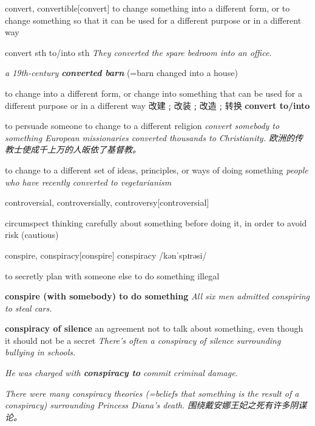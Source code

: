 \begin{DefWord}{convert, convertible}[convert]
    to change something into a different form, or to change something so that it can be used for a different purpose or in a different way

    convert sth to/into sth
    \textit{They converted the spare bedroom into an office.}

    \textit{a 19th-century \textbf{converted barn}} (=barn changed into a house)

    to change into a different form, or change into something that can be used for a different purpose or in a different way 改建﹔改装﹔改造﹔转换
    \textbf{convert to/into}

    to persuade someone to change to a different religion
    \textit{convert somebody to something
    European missionaries converted thousands to Christianity. 欧洲的传教士使成千上万的人皈依了基督教。}

    to change to a different set of ideas, principles, or ways of doing something
    \textit{people who have recently converted to vegetarianism}
\end{DefWord}

\begin{DefWord}{controversial, controversially, controversy}[controversial]
\end{DefWord}

\begin{DefWord}{circumspect}
    thinking carefully about something before doing it, in order to avoid risk (cautious)
\end{DefWord}

\begin{DefWord}{conspire, conspiracy}[conspire]
    conspiracy /kənˈspɪrəsi/

    to secretly plan with someone else to do something illegal

    \textbf{conspire (with somebody) to do something}
    \textit{All six men admitted conspiring to steal cars.}

    \textbf{conspiracy of silence} an agreement not to talk about something, even though it should not be a secret
    \textit{There’s often a conspiracy of silence surrounding bullying in schools.}

    \textit{He was charged with \textbf{conspiracy to} commit criminal damage.}

    \textit{There were many conspiracy theories (=beliefs that something is the result of a conspiracy) surrounding Princess Diana’s death. 围绕戴安娜王妃之死有许多阴谋论。}
\end{DefWord}